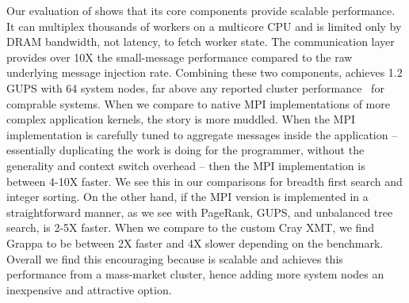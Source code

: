 Our evaluation of \Grappa shows that its core components provide scalable performance.  It can multiplex thousands of workers on a multicore CPU and is limited only by DRAM bandwidth, not latency, to fetch worker state.  The communication layer provides over 10X the small-message performance compared to the raw underlying message injection rate.  Combining these two components, \Grappa achieves 1.2 GUPS with 64 system nodes, far above any reported cluster performance~\cite{gups} for comprable systems.  When we compare \Grappa to native MPI implementations of more complex application kernels, the story is more muddled.  When the MPI implementation is carefully tuned to aggregate messages inside the application -- essentially duplicating the work \Grappa is doing for the programmer, without the generality and context switch overhead -- then the MPI implementation is between 4-10X faster.  We see this in our comparisons for breadth first search and integer sorting.  On the other hand, if the MPI version is implemented in a straightforward manner, as we see with PageRank, GUPS, and unbalanced tree search, \Grappa is 2-5X faster.  When we compare \Grappa to the custom Cray XMT, we find Grappa to be between 2X faster and 4X slower depending on the benchmark.  Overall we find this encouraging because \Grappa is scalable and achieves this performance from a mass-market cluster, hence adding more system nodes an inexpensive and attractive option.
 



